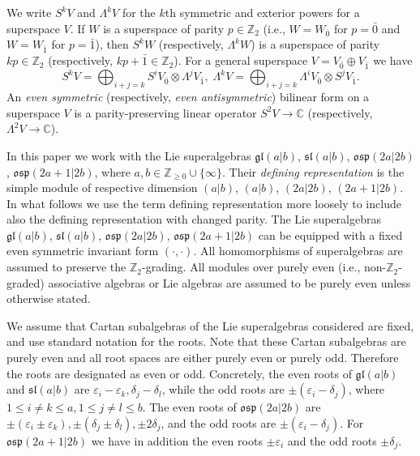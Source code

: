 \documentclass[12pt]{amsart}
\theoremstyle{plain} %
\numberwithin{equation}{section}
\theoremstyle{definition}
\theoremstyle{remark}
\theoremstyle{plain} %
\renewcommand{\sl}{\mathfrak{sl}}
\newcommand{\osp}{\mathfrak{osp}}
\newcommand{\C}{\mathbb{C}}
\begin{document}
We write $S^k V$  and  $\Lambda^k V$  for the $k$th  symmetric and exterior powers for a superspace $V$. If $W$ is a superspace of parity $p \in \mathbb Z_2 $ (i.e., $W = W_{\bar{0}}$ for $p=\bar{0}$ and $W = W_{\bar{1}}$ for $p=\bar{1}$), then $S^k W$  (respectively, $\Lambda^k W$) is a superspace of parity $kp \in \mathbb Z_2 $ (respectively, $kp + \bar{1} \in \mathbb Z_2 $). For a general superspace $V = V_{\bar{0}} \oplus V_{\bar{1}}$ we have
      $$
   S^kV = \bigoplus_{i+j = k} {S}^{i}V_{\bar{0}} \otimes \Lambda^{j} V_{\bar{1}}, \;   \Lambda^kV = \bigoplus_{i+j = k} \Lambda^{i}V_{\bar{0}} \otimes S^{j} V_{\bar{1}}.
   $$
  An \emph{ even  symmetric} (respectively, \emph{even antisymmetric}) bilinear form on a superspace $V$ is a parity-preserving linear operator $S^2V \to \C$ (respectively, $\Lambda^2V \to \C$).
  
  
  In this paper we work with the Lie superalgebras $\mathfrak{gl}(a|b)$, $\sl (a|b)$, $\osp (2a|2b)$, $\osp (2a+1|2b)$, where $a, b \in \mathbb Z_{\geq 0} \cup \{ \infty\}$. Their  \emph{defining representation} is the  simple module of respective dimension $(a|b)$,  $(a|b)$, $(2a|2b)$, $(2a+1|2b)$. In what follows we use the term defining representation more loosely to include also the defining representation with changed parity. The Lie superalgebras $\mathfrak{gl}(a|b)$, $\sl (a|b)$, $\osp (2a|2b)$, $\osp (2a+1|2b)$ can be equipped with a fixed even symmetric invariant form  $(\cdot, \cdot)$. All homomorphisms of superalgebras are assumed to preserve the $\mathbb Z_2$-grading.  All modules over purely even (i.e., non-$\mathbb Z_2$-graded) associative algebras or Lie algebras are assumed to be purely even unless otherwise stated.
  
  
  We assume that  Cartan subalgebras of the Lie superalgebras considered are fixed, and use standard notation for the roots.  Note that these Cartan subalgebras are purely even and all root spaces are either purely even or purely odd. Therefore the roots are designated as even or odd.    Concretely, the even roots of  $\mathfrak{gl}(a|b)$ and  $\sl (a|b)$ are 
$\varepsilon_i - \varepsilon_{k}, \delta_j - \delta_l$, while the odd roots are $\pm (\varepsilon_i - \delta_j)$, where $1\leq i \neq k \leq a, 1 \leq j \neq l \leq b 
$. The even roots of $\mathfrak{osp}(2a|2b)$ are $\pm ( \varepsilon_i \pm  \varepsilon_{k}), \pm (\delta_j \pm  \delta_l), \pm 2 \delta_j$, and the odd roots are $\pm (\varepsilon_i - \delta_j)$. For $\mathfrak{osp}(2a+1|2b)$ we have in addition the even roots $ \pm  \varepsilon_i $ and the odd roots  $\pm \delta_j$. 
\end{document}

